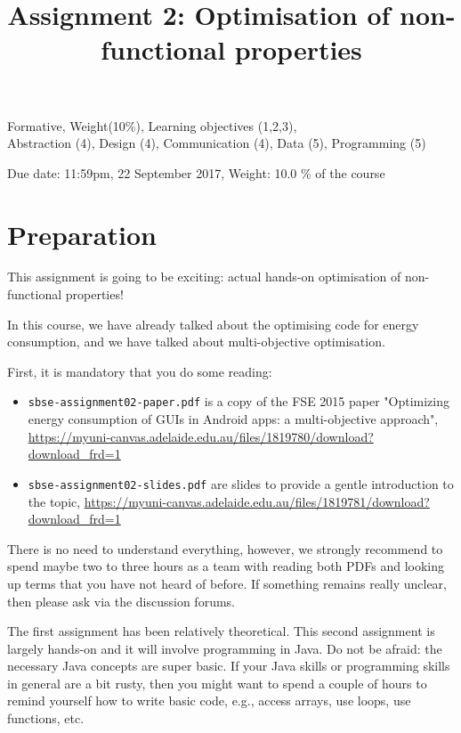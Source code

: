 \documentclass{pracs}
\newcommand{\duedate}{22 September 2017}
\begin{document}
\title{Assignment 2: Optimisation of non-functional properties}
\maketitle
\thispagestyle{fancy}


	Formative, 	Weight(10\%), 	Learning objectives (1,2,3),\\
 	Abstraction (4), 	Design (4), 	Communication (4), 	Data (5),	Programming (5)


\begin{center}
Due date: 11:59pm, \duedate, Weight: 10.0 \% of the course
\end{center}

\sloppy

\section*{Preparation}

This assignment is going to be exciting: actual hands-on optimisation of non-functional properties!

In this course, we have already talked about the optimising code for energy consumption, and we have talked about multi-objective optimisation.

First, it is mandatory that you do some reading: 

\begin{itemize}
\item \texttt{sbse-assignment02-paper.pdf} is a copy of the FSE 2015 paper "Optimizing energy consumption of GUIs in Android apps: a multi-objective approach", \url{https://myuni-canvas.adelaide.edu.au/files/1819780/download?download_frd=1}
\item \texttt{sbse-assignment02-slides.pdf} are slides to provide a gentle introduction to the topic, \url{https://myuni-canvas.adelaide.edu.au/files/1819781/download?download_frd=1}
\end{itemize}

There is no need to understand everything, however, we strongly recommend to spend maybe two to three hours as a team with reading both PDFs and looking up terms that you have not heard of before. If something remains really unclear, then please ask via the discussion forums. 

The first assignment has been relatively theoretical. This second assignment is largely hands-on and it will involve programming in Java. Do not be afraid: the necessary Java concepts are super basic. If your Java skills or programming skills in general are a bit rusty, then you might want to spend a couple of hours to remind yourself how to write basic code, e.g., access arrays, use loops, use functions, etc.
\end{document}
